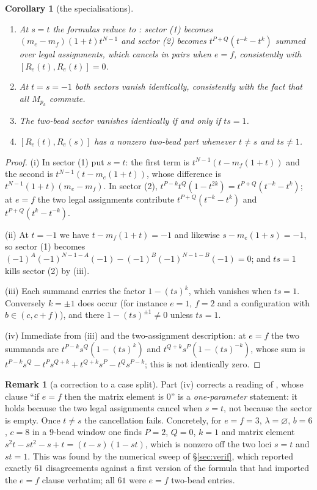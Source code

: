 \documentclass[11pt]{article}
\newtheorem{corollary}[theorem]{Corollary}
\theoremstyle{definition}
\newtheorem{remark}[theorem]{Remark}
\begin{document}
\begin{corollary}[the specialisations]\label{cor:spec}
\leavevmode
\begin{enumerate}
\item[(i)] At $s=t$ the formulas reduce to \cite[Thm.~2.3]{Clio0907}: sector (1) becomes
$(m_e-m_f)(1+t)t^{N-1}$ and sector (2) becomes $t^{P+Q}(t^{-k}-t^{k})$ summed over legal
assignments, which cancels in pairs when $e=f$, consistently with $[R_e(t),R_e(t)]=0$.
\item[(ii)] At $t=s=-1$ both sectors vanish identically, consistently with the fact that
all $M_{p_k}$ commute.
\item[(iii)] The two-bead sector vanishes identically \emph{if and only if} $ts=1$.
\item[(iv)] $[R_e(t),R_e(s)]$ has a nonzero two-bead part whenever $t\neq s$ and
$ts\neq1$.
\end{enumerate}
\end{corollary}

\begin{proof}
(i) In sector (1) put $s=t$: the first term is $t^{N-1}(t-m_f(1+t))$ and the second is
$t^{N-1}(t-m_e(1+t))$, whose difference is $t^{N-1}(1+t)(m_e-m_f)$.  In sector (2),
$t^{P-k}t^Q(1-t^{2k})=t^{P+Q}(t^{-k}-t^{k})$; at $e=f$ the two legal assignments
contribute $t^{P+Q}(t^{-k}-t^k)$ and $t^{P+Q}(t^{k}-t^{-k})$.

(ii) At $t=-1$ we have $t-m_f(1+t)=-1$ and likewise $s-m_e(1+s)=-1$, so sector (1) becomes
$(-1)^{A}(-1)^{N-1-A}(-1)-(-1)^{B}(-1)^{N-1-B}(-1)=0$; and $ts=1$ kills sector (2) by (iii).

(iii) Each summand carries the factor $1-(ts)^{k}$, which vanishes when $ts=1$.
Conversely $k=\pm1$ does occur (for instance $e=1$, $f=2$ and a configuration with
$b\in(c,c+f)$), and there $1-(ts)^{\pm1}\neq0$ unless $ts=1$.

(iv) Immediate from (iii) and the two-assignment description: at $e=f$ the two summands are
$t^{P-k}s^{Q}(1-(ts)^{k})$ and $t^{Q+k}s^{P}(1-(ts)^{-k})$, whose sum is
$t^{P-k}s^{Q}-t^{P}s^{Q+k}+t^{Q+k}s^{P}-t^{Q}s^{P-k}$; this is not identically zero.
\end{proof}

\begin{remark}[a correction to a case split]\label{rem:casesplit}
Part (iv) corrects a reading of \cite[Thm.~2.3(2)]{Clio0907}, whose clause ``if $e=f$ then
the matrix element is $0$'' is a \emph{one-parameter} statement: it holds because the two
legal assignments cancel when $s=t$, not because the sector is empty.  Once $t\neq s$ the
cancellation fails.  Concretely, for $e=f=3$, $\lambda=\varnothing$, $b=6$, $c=8$ in a
$9$-bead window one finds $P=2$, $Q=0$, $k=1$ and matrix element
$s^{2}t-st^{2}-s+t=(t-s)(1-st)$, which is nonzero off the two loci $s=t$ and $st=1$.  This
was found by the numerical sweep of \S\ref{sec:verif}, which reported exactly $61$
disagreements against a first version of the formula that had imported the $e=f$ clause
verbatim; all $61$ were $e=f$ two-bead entries.
\end{remark}
\end{document}
